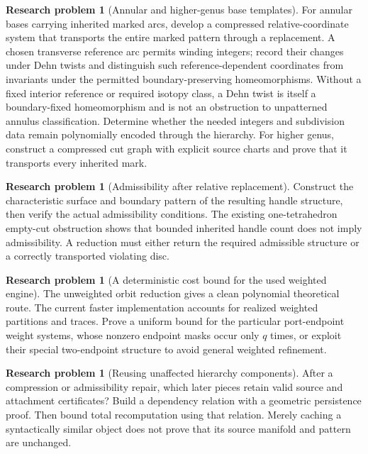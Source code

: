\documentclass[11pt]{article}
\theoremstyle{definition}
\newtheorem{problem}[theorem]{Research problem}
\theoremstyle{remark}
\begin{document}
\begin{problem}[Annular and higher-genus base templates]
For annular bases carrying inherited marked arcs, develop a compressed
relative-coordinate system that transports the entire marked pattern
through a replacement. A chosen transverse reference arc permits winding
integers; record their changes under Dehn twists and distinguish such
reference-dependent coordinates from invariants under the permitted
boundary-preserving homeomorphisms. Without a fixed interior reference or
required isotopy class, a Dehn twist is itself a boundary-fixed
homeomorphism and is not an obstruction to unpatterned annulus
classification. Determine whether the needed integers and subdivision
data remain polynomially encoded through the hierarchy. For higher genus,
construct a compressed cut graph with explicit source charts and prove
that it transports every inherited mark.
\end{problem}

\begin{problem}[Admissibility after relative replacement]
Construct the characteristic surface and boundary pattern of the
resulting handle structure, then verify the actual admissibility
conditions. The existing one-tetrahedron empty-cut obstruction shows
that bounded inherited handle count does not imply admissibility.
A reduction must either return the required admissible structure or a
correctly transported violating disc.
\end{problem}

\begin{problem}[A deterministic cost bound for the used weighted engine]
The unweighted orbit reduction gives a clean polynomial theoretical
route. The current faster implementation accounts for realized weighted
partitions and traces. Prove a uniform bound for the particular
port-endpoint weight systems, whose nonzero endpoint masks occur only
\(q\) times, or exploit their special two-endpoint structure to avoid
general weighted refinement.
\end{problem}

\begin{problem}[Reusing unaffected hierarchy components]
After a compression or admissibility repair, which later pieces retain
valid source and attachment certificates? Build a dependency relation
with a geometric persistence proof. Then bound total recomputation
using that relation. Merely caching a syntactically similar object
does not prove that its source manifold and pattern are unchanged.
\end{problem}
\end{document}

